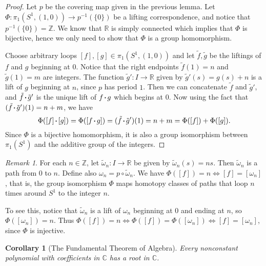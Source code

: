\documentclass{report}
\newtheorem{corollary}{Corollary}[section]
\theoremstyle{definition}
\theoremstyle{remark}
\newtheorem{remark}{Remark}[section]
\newcommand{\Z}{\mathbb{Z}}
\newcommand{\R}{\mathbb{R}}
\newcommand{\C}{\mathbb{C}}
\newcommand{\set}[1]{\{#1\}}
\newcommand*\concat{\mathbin{\vcenter{\hbox{\rule{.3ex}{.3ex}}}}}
\begin{document}
\begin{proof}
    Let $p$ be the covering map given in the previous lemma. Let $\Phi : \pi_1(S^1, (1, 0)) \to p^{-1}(\set{0})$ be a lifting correspondence, and notice that $p^{-1}(\set{0}) = \Z$. We know that $\R$ is simply connected which implies that $\Phi$ is bijective, hence we only need to show that $\Phi$ is a group homomorphism.
    
    Choose arbitrary loops $[f], [g] \in \pi_1(S^1, (1,0))$ and let $\tilde{f}, \tilde{g}$ be the liftings of $f$ and $g$ beginning at $0$. Notice that the right endpoints $\tilde{f}(1) = n$ and $\tilde{g}(1) = m$ are integers. The function $\tilde{g}' : I \to \R$ given by $\tilde{g}'(s) = g(s) + n$ is a lift of $g$ beginning at $n$, since $p$ has period $1$. Then we can concatenate $\tilde{f}$ and $\tilde{g}'$, and $\tilde{f} \concat \tilde{g}'$ is the unique lift of $f \concat g$ which begins at $0$. Now using the fact that $(\tilde{f} \concat \tilde{g}')(1) = n + m$, we have 
    \begin{equation*}
        \Phi([f] \concat [g]) = \Phi([f \concat g]) = (\tilde{f} \concat \tilde{g}')(1) = n + m = \Phi([f]) + \Phi([g]).
    \end{equation*} Since $\Phi$ is a bijective homomorphism, it is also a group isomorphism between $\pi_1(S^1)$ and the additive group of the integers.
\end{proof}

\begin{remark}
     For each $n \in \Z$, let $\tilde{\omega}_n : I \to \R$ be given by $\tilde{\omega}_n(s) = n s$. Then $\tilde{\omega}_n$ is a path from $0$ to $n$. Define also $\omega_n = p \circ \tilde{\omega}_n$. We have $\Phi([f]) = n \iff [f] = [\omega_n]$, that is, the group isomorphism $\Phi$ maps homotopy classes of paths that loop $n$ times around $S^1$ to the integer $n$.
     
     To see this, notice that $\tilde{\omega}_n$ is a lift of $\omega_n$ beginning at $0$ and ending at $n$, so $\Phi([\omega_n]) = n$. Thus $\Phi([f]) = n \iff \Phi([f]) = \Phi([\omega_n]) \iff [f] = [\omega_n]$, since $\Phi$ is injective.
\end{remark}

\begin{corollary}[The Fundamental Theorem of Algebra]
    Every nonconstant polynomial with coefficients in $\C$ has a root in $\C$.
\end{corollary}
\end{document}

